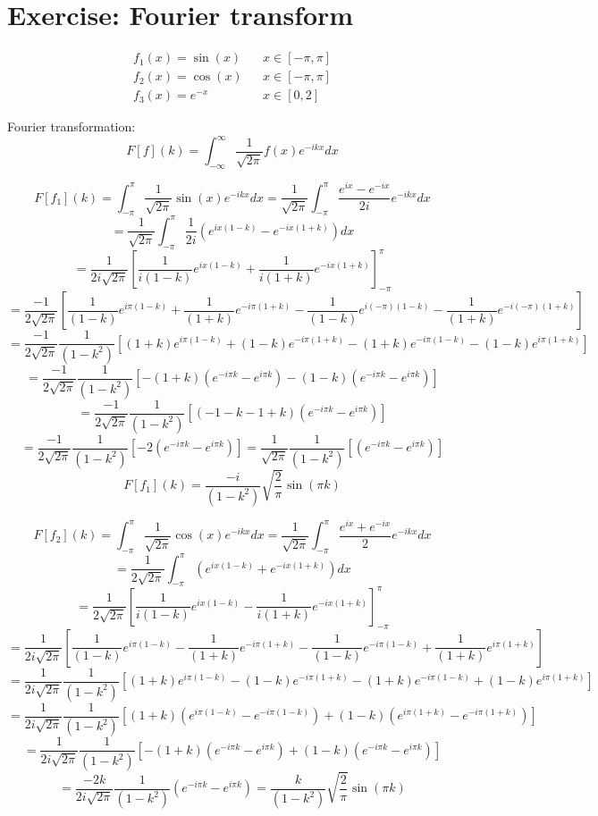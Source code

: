 \documentclass[11pt]{article}
\begin{document}
\date{\today}

\section{Exercise: Fourier transform}

\[ \begin{aligned}
	f_1(x) = \sin(x) &  &  x \in [-\pi,\pi] \\
	f_2(x) = \cos(x) &  &  x \in [-\pi,\pi] \\
	f_3(x) = e^{-x} &  &  x \in [0,2]
\end{aligned} \]

Fourier transformation:
\[ F[f](k) = \int_{-\infty}^{\infty} \frac{1}{\sqrt{2\pi}} f(x) e^{-ikx} dx \]

\[ F[f_1](k) = \int_{-\pi}^{\pi} \frac{1}{\sqrt{2\pi}} \sin(x) e^{-ikx} dx =  \frac{1}{\sqrt{2\pi}} \int_{-\pi}^{\pi} \frac{e^{ix}-e^{-ix}}{2i} e^{-ikx} dx \]
\[ = \frac{1}{\sqrt{2\pi}} \int_{-\pi}^{\pi} \frac{1}{2i} \left(e^{ix(1-k)} - e^{-ix(1+k)}\right) dx \]
\[ = \frac{1}{2i\sqrt{2\pi}} \left[\frac{1}{i(1-k)}e^{ix(1-k)} + \frac{1}{i(1+k)}e^{-ix(1+k)}\right]_{-\pi}^{\pi} \]
\[ = \frac{-1}{2\sqrt{2\pi}} \left[\frac{1}{(1-k)}e^{i\pi(1-k)} + \frac{1}{(1+k)}e^{-i\pi(1+k)} - \frac{1}{(1-k)}e^{i(-\pi)(1-k)} - \frac{1}{(1+k)}e^{-i(-\pi)(1+k)}\right]\]
\[ = \frac{-1}{2\sqrt{2\pi}}\frac{1}{(1 - k^2)} \left[(1+k)e^{i\pi(1-k)} + (1-k)e^{-i\pi(1+k)} - (1+k)e^{-i\pi(1-k)} - (1-k)e^{i\pi(1+k)}\right]\]
\[ = \frac{-1}{2\sqrt{2\pi}}\frac{1}{(1 - k^2)} \left[-(1+k)(e^{- i\pi k} - e^{i\pi k}) - (1-k)(e^{-i\pi k}  - e^{i\pi k})\right]\]
\[ = \frac{-1}{2\sqrt{2\pi}}\frac{1}{(1 - k^2)} \left[(- 1 - k - 1 + k)(e^{- i\pi k} - e^{i\pi k})\right]\]
\[ = \frac{-1}{2\sqrt{2\pi}}\frac{1}{(1 - k^2)} \left[-2 (e^{- i\pi k} - e^{i\pi k})\right] = \frac{1}{\sqrt{2\pi}}\frac{1}{(1 - k^2)} \left[ (e^{- i\pi k} - e^{i\pi k})\right]\]
\[ F[f_1](k) = \frac{-i}{(1 - k^2)}\sqrt{\frac{2}{\pi}} \sin(\pi k)\]

\newpage
\[ F[f_2](k) = \int_{-\pi}^{\pi} \frac{1}{\sqrt{2\pi}} \cos(x) e^{-ikx} dx =  \frac{1}{\sqrt{2\pi}} \int_{-\pi}^{\pi} \frac{e^{ix}+e^{-ix}}{2} e^{-ikx} dx \]
\[ = \frac{1}{2\sqrt{2\pi}} \int_{-\pi}^{\pi} \left(e^{ix(1-k)} + e^{-ix(1+k)}\right) dx \]
\[ = \frac{1}{2\sqrt{2\pi}} \left[\frac{1}{i(1-k)}e^{ix(1-k)} - \frac{1}{i(1+k)}e^{-ix(1+k)}\right]_{-\pi}^{\pi} \]
\[ = \frac{1}{2i\sqrt{2\pi}} \left[\frac{1}{(1-k)}e^{i\pi(1-k)} - \frac{1}{(1+k)}e^{-i\pi(1+k)} - \frac{1}{(1-k)}e^{-i\pi(1-k)} + \frac{1}{(1+k)}e^{i\pi(1+k)}\right] \]
\[ = \frac{1}{2i\sqrt{2\pi}}\frac{1}{(1-k^2)} \left[(1+k)e^{i\pi(1-k)} - (1-k)e^{-i\pi(1+k)} - (1+k)e^{-i\pi(1-k)} + (1-k)e^{i\pi(1+k)}\right] \]
\[ = \frac{1}{2i\sqrt{2\pi}}\frac{1}{(1-k^2)} \left[(1+k)(e^{i\pi(1-k)} - e^{-i\pi(1-k)}) + (1-k)(e^{i\pi(1+k)} - e^{-i\pi(1+k)})\right] \]
\[ = \frac{1}{2i\sqrt{2\pi}}\frac{1}{(1-k^2)} \left[-(1+k)(e^{-i\pi k} - e^{i\pi k}) + (1-k)(e^{-i\pi k} - e^{i\pi k})\right] \]
\[ = \frac{-2 k}{2i\sqrt{2\pi}}\frac{1}{(1-k^2)} (e^{-i\pi k} - e^{i\pi k}) = \frac{k}{(1-k^2)}\sqrt{\frac{2}{\pi}} \sin(\pi k) \]
\end{document}
